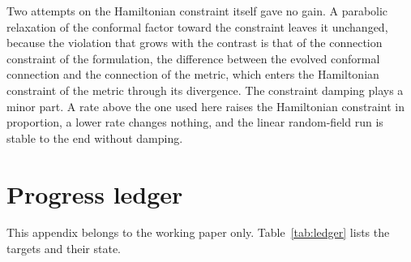 \documentclass[aps,prd,twocolumn,10pt,superscriptaddress,nofootinbib,longbibliography,floatfix]{revtex4-2}
\begin{document}
Two attempts on the Hamiltonian constraint itself gave no gain. A parabolic relaxation of the conformal factor toward the constraint leaves it unchanged, because the violation that grows with the contrast is that of the connection constraint of the formulation, the difference between the evolved conformal connection and the connection of the metric, which enters the Hamiltonian constraint of the metric through its divergence. The constraint damping plays a minor part. A rate above the one used here raises the Hamiltonian constraint in proportion, a lower rate changes nothing, and the linear random-field run is stable to the end without damping.

\appendix

\section{Progress ledger}\label{app:ledger}

This appendix belongs to the working paper only. Table~\ref{tab:ledger} lists the targets and their state.
\end{document}
